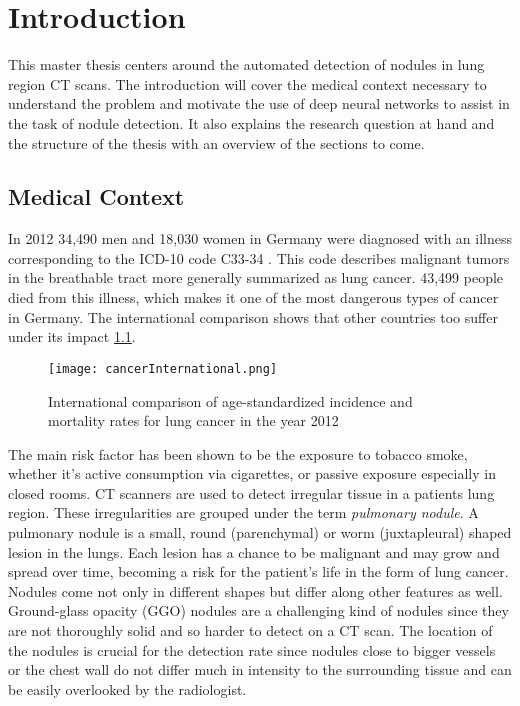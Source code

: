 \documentclass[main.tex]{subfiles}
\begin{document}
\chapter{Introduction}
This master thesis centers around the automated detection of nodules in lung region CT scans. The introduction will cover the medical context necessary to understand the problem and motivate the use of deep neural networks to assist in the task of nodule detection. It also explains the research question at hand and the structure of the thesis with an overview of the sections to come.

\section{Medical Context}
In 2012 34,490 men and 18,030 women in Germany were diagnosed with an illness corresponding to the ICD-10 code C33-34 \cite{koch2015krebs}. This code describes malignant tumors in the breathable tract more generally summarized as lung cancer. 43,499 people died from this illness, which makes it one of the most dangerous types of cancer in Germany. The international comparison shows that other countries too suffer under its impact \ref{fig:cancInt}.

\begin{figure}[ht]
\texttt{[image: cancerInternational.png]}
\caption{International comparison of age-standardized incidence and mortality rates for lung cancer in the year 2012}
\label{fig:cancInt}
\end{figure}

The main risk factor has been shown to be the exposure to tobacco smoke, whether it's active consumption via cigarettes, or passive exposure especially in closed rooms. CT scanners are used to detect irregular tissue in a patients lung region. These irregularities are grouped under the term \textit{pulmonary nodule}. A pulmonary nodule is a small, round (parenchymal) or worm (juxtapleural) shaped lesion in the lungs. Each lesion has a chance to be malignant and may grow and spread over time, becoming a risk for the patient's life in the form of lung cancer. Nodules come not only in different shapes but differ along other features as well. Ground-glass opacity (GGO) nodules are a challenging kind of nodules since they are not thoroughly solid and so harder to detect on a CT scan. The location of the nodules is crucial for the detection rate since nodules close to bigger vessels or the chest wall do not differ much in intensity to the surrounding tissue and can be easily overlooked by the radiologist.
\end{document}

